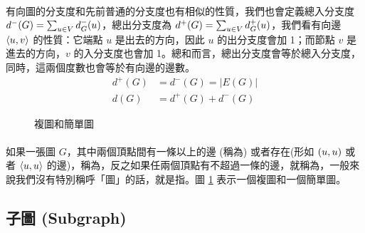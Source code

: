 \documentclass[12pt,a4paper,oneside]{report}
\begin{document}
\begin{CJK}{UTF8}{bkai}
\paragraph{}有向圖的分支度和先前普通的分支度也有相似的性質，我們也會定義總入分支度 $d^{-}{(G)}=\sum_{u\in{V}}{d^{-}_{G}{(u)}}$，總出分支度為 $d^{+}{(G)}=\sum_{u\in{V}}{d^{+}_{G}{(u)}}$，我們看有向邊 $\langle{}{{u},{v}}\rangle{}$ 的性質：它端點 $u$ 是出去的方向，因此 $u$ 的出分支度會加 1；而節點 $v$ 是進去的方向，$v$ 的入分支度也會加 1。總和而言，總出分支度會等於總入分支度，同時，這兩個度數也會等於有向邊的邊數。
\begin{align}
\label{eq:degree_directed}
d^{+}{(G)}&=d^{-}{(G)}=|E(G)|\\
d(G)&=d^{+}{(G)}+d^{-}{(G)}
\end{align}
\begin{figure}[h!]
\centering
{}
\caption{複圖和簡單圖}
\label{fig:multigraph_and_simple}
\end{figure}
\paragraph{}如果一張圖 $G$，其中兩個頂點間有一條以上的邊 (稱為) 或者存在\textbf{}(形如 $({u},{u})$ 或者 $\langle{}{{u},{u}}\rangle{}$ 的邊)，稱為，反之如果任兩個頂點有不超過一條的邊，就稱為\textbf{}，一般來說我們沒有特別稱呼「圖」的話，就是指。圖 \ref{fig:multigraph_and_simple} 表示一個複圖和一個簡單圖。

\subsection{子圖 (Subgraph)}

\end{CJK}
\end{document}
